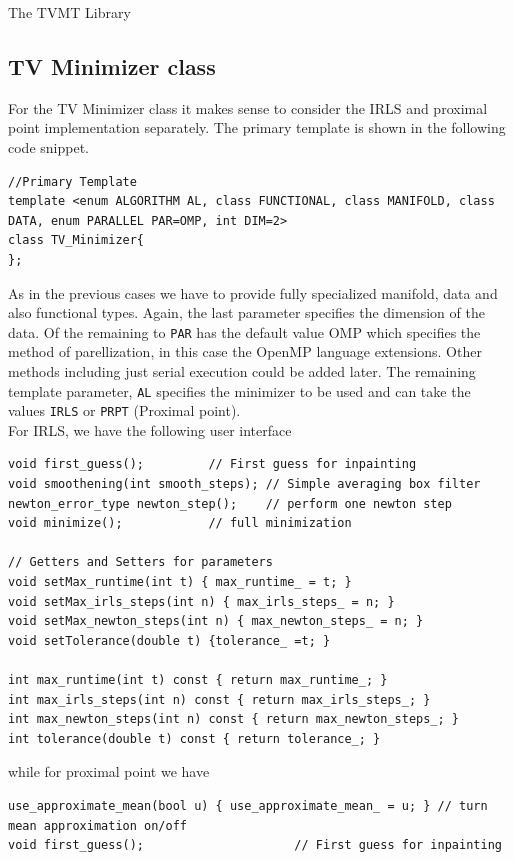 \begin{chapter}{The TVMT Library}
\subsection{TV Minimizer class} %
\label{sub:TVMinimizer class}
For the TV Minimizer class it makes sense to consider the IRLS and proximal point implementation separately. The primary template is shown in the following code snippet.
\cppinline
\begin{lstlisting}
//Primary Template 
template <enum ALGORITHM AL, class FUNCTIONAL, class MANIFOLD, class DATA, enum PARALLEL PAR=OMP, int DIM=2>
class TV_Minimizer{ 
};
\end{lstlisting}
As in the previous cases we have to provide fully specialized manifold, data and also functional types. Again, the last parameter specifies the dimension of the data. Of the
remaining to \texttt{PAR} has the default value OMP which specifies the method of parellization, in this case the OpenMP language extensions. Other methods including just serial
execution could be added later. The remaining template parameter, \texttt{AL} specifies the minimizer to be used and can take the values \texttt{IRLS} or \texttt{PRPT} (Proximal point).\\

For IRLS, we have the following user interface\\
\cppinline
\begin{lstlisting}
void first_guess();		    // First guess for inpainting
void smoothening(int smooth_steps); // Simple averaging box filter
newton_error_type newton_step();    // perform one newton step
void minimize();		    // full minimization

// Getters and Setters for parameters
void setMax_runtime(int t) { max_runtime_ = t; }
void setMax_irls_steps(int n) { max_irls_steps_ = n; }
void setMax_newton_steps(int n) { max_newton_steps_ = n; }
void setTolerance(double t) {tolerance_ =t; }
	    
int max_runtime(int t) const { return max_runtime_; }
int max_irls_steps(int n) const { return max_irls_steps_; }
int max_newton_steps(int n) const { return max_newton_steps_; }
int tolerance(double t) const { return tolerance_; }
\end{lstlisting}

while for proximal point we have\\
\cppinline
\begin{lstlisting}
use_approximate_mean(bool u) { use_approximate_mean_ = u; } // turn mean approximation on/off
void first_guess();					    // First guess for inpainting
 

\end{lstlisting}
\end{chapter}
